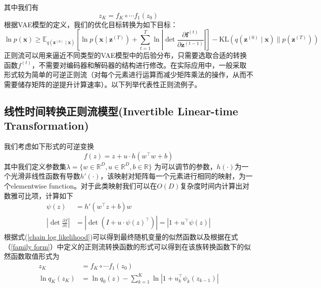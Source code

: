 其中我们有
\begin{equation}
    z_{K}=f_{K}\circ \cdots f_1(z_0)
    \label{z_K definition}
\end{equation}
根据VAE模型的定义，我们的优化目标转换为如下目标：
\begin{equation}
    \ln p(\mathbf{x}) \geq \mathbb{E}_{q\left(\mathbf{z}^{(0)} \mid \mathbf{x}\right)}\left[\ln p\left(\mathbf{x} \mid \mathbf{z}^{(T)}\right)+\sum_{t=1}^T \ln \left|\operatorname{det} \frac{\partial \mathbf{f}^{(t)}}{\partial \mathbf{z}^{(t-1)}}\right|\right]-\mathrm{KL}\left(q\left(\mathbf{z}^{(0)} \mid \mathbf{x}\right) \| p\left(\mathbf{z}^{(T)}\right)\right)
    \label{NF objective}
    \end{equation}
正则流可以用来逼近不同类型的VAE模型中的后验分布，只需要选取合适的转换函数$f^{(t)}$，不需要对编码器和解码器的结构进行修改。在实际应用中，一般采取形式较为简单的可逆正则流（对每个元素进行运算而减少矩阵乘法的操作，从而不需要储存矩阵的逆提升计算速率）。以下列举代表性正则流例子。
\subsection{线性时间转换正则流模型(Invertible Linear-time Transformation)}
我们考虑如下形式的可逆变换
\begin{equation}
    f(z) = z+ u\cdot h(w^{\top } w + b)
    \label{family form}
\end{equation}
其中我们定义参数集$\lambda = \{w\in \mathbb{R}^{D}, u\in \mathbb{R}^D,b\in \mathbb{R}\}$ 为可以调节的参数，$h(\cdot)$为一个光滑非线性函数有导数$h'(\cdot)$，该映射对矩阵每一个元素进行相同的映射，为一个elementwise function。对于此类映射我们可以在$O(D)$复杂度时间内计算出对数雅可比项，计算如下
\begin{align}
    \psi(z) &= h'(w^{\top}z+b)w\\
    |\operatorname{det}\frac{\partial f}{\partial z}| &= |\operatorname{det}(I+u\cdot \psi(z)^{\top})|=|1+u^{\top}\psi(z)|
\end{align}
根据式(\ref{chain log likelihood})可以得到最终随机变量的似然函数以及根据在式（\ref{family form}）中定义的正则流转换函数的形式可以得到在该族转换函数下的似然函数取值形式为
\begin{align}
     z_{K} &=f_{K}\circ \cdots f_1(z_0) \\
     \ln q_{K}(z_{K})&= \ln q_0(z)-\sum_{k=1}^{K}\ln |1+u_{k}^{\top}\psi_{k}(z_{k-1})|
\end{align}

